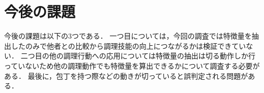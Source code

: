 \section{今後の課題}

今後の課題は以下の3つである．
一つ目については，今回の調査では特徴量を抽出したのみで他者との比較から調理技能の向上につながるかは検証できていない．
二つ目の他の調理行動への応用については特徴量の抽出は切る動作しか行っていないため他の調理動作でも特徴量を算出できるかについて調査する必要がある．
最後に，包丁を持つ際などの動きが切っていると誤判定される問題がある．


